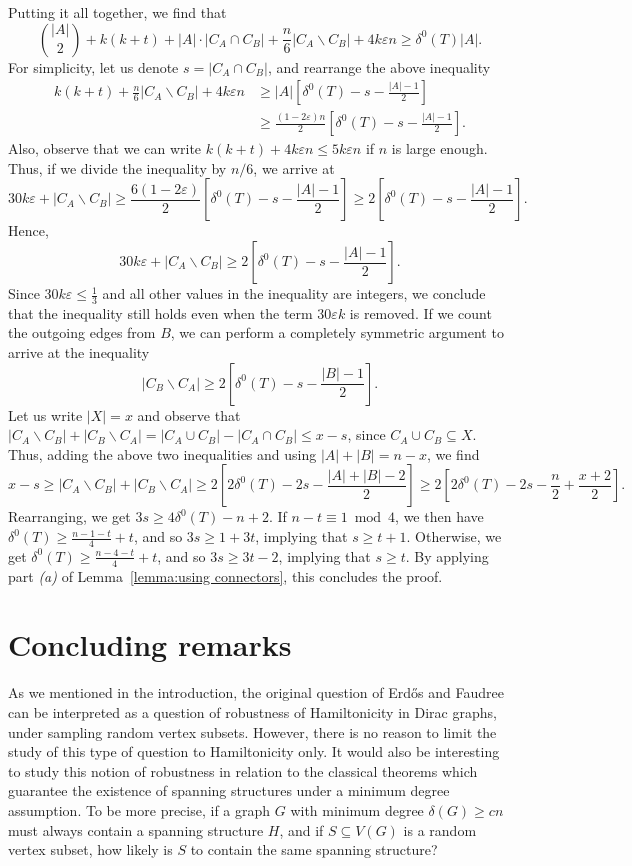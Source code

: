 \documentclass[a4paper,11pt]{article}
\makeatletter
\renewenvironment{proof}[1][\proofname] {\par\pushQED{\qed}\normalfont\topsep6\p@\@plus6\p@\relax\trivlist\item[\hskip\labelsep\textit{#1}\@addpunct{.}]\ignorespaces}{\popQED\endtrivlist\@endpefalse}
\theoremstyle{definition}
\def\eps{\varepsilon}
\makeatother
\begin{document}
\begin{proof}[Proof of Theorem~\ref{thm:main}.]
Putting it all together, we find that
\[\binom{|A|}{2}+k(k+t)+|A|\cdot |C_A\cap C_B|+\frac{n}{6}|C_A\backslash C_B|+4k\eps n\geq \delta^0(T) |A|.\]
For simplicity, let us denote $s=|C_A\cap C_B|$, and rearrange the above inequality
\begin{align*}
k(k+t)+\frac{n}{6}|C_A\backslash C_B|+4k\eps n&\geq |A|\left[\delta^0(T)-s-\frac{|A|-1}{2}\right]\\
&\geq \frac{(1-2\eps)n}{2}\left[\delta^0(T)-s-\frac{|A|-1}{2}\right].
\end{align*}
Also, observe that we can write $k(k+t)+4k\eps n\leq 5k\eps n$ if $n$ is large enough. Thus, if we divide the inequality by $n/6$, we arrive at 
\[30k\eps+|C_A\backslash C_B|\geq \frac{6(1-2\eps)}{2}\left[\delta^0(T)-s-\frac{|A|-1}{2}\right]\geq 2\left[\delta^0(T)-s-\frac{|A|-1}{2}\right].
\]
Hence,
\[30k\eps+|C_A\backslash C_B|\geq 2\left[\delta^0(T)-s-\frac{|A|-1}{2}\right].\]
Since $30k\eps\leq \frac{1}{3}$ and all other values in the inequality are integers, we conclude that the inequality still holds even when the term $30\eps k$ is removed. If we count the outgoing edges from $B$, we can perform a completely symmetric argument to arrive at the inequality
\[|C_B\backslash C_A|\geq 2\left[\delta^0(T)-s-\frac{|B|-1}{2}\right].\]
Let us write $|X|=x$ and observe that $|C_A\backslash C_B|+|C_B\backslash C_A|=|C_A\cup C_B|-|C_A\cap C_B|\leq x-s$, since $C_A\cup C_B\subseteq X$. Thus, adding the above two inequalities and using $|A|+|B|=n-x$, we find
\[x-s\geq |C_A\backslash C_B|+|C_B\backslash C_A|\geq 2\left[2\delta^0(T)-2s-\frac{|A|+|B|-2}{2}\right]\geq 2\left[2\delta^0(T)-2s-\frac{n}{2}+\frac{x+2}{2}\right].\]
Rearranging, we get $3s\geq 4\delta^0(T) - n+2$. If $n-t\equiv 1\bmod 4$, we then have $\delta^0(T)\geq \frac{n-1-t}{4}+t$, and so $3s\geq 1+3t$, implying that $s\geq t+1$. Otherwise, we get $\delta^0(T)\geq \frac{n-4-t}{4}+t$, and so $3s\geq 3t-2$, implying that $s\geq t$. By applying part \textit{(a)} of Lemma~\ref{lemma:using connectors}, this concludes the proof.
\end{proof}

\section{Concluding remarks}

As we mentioned in the introduction, the original question of Erd\H{o}s and Faudree can be interpreted as a question of robustness of Hamiltonicity in Dirac graphs, under sampling random vertex subsets. However, there is no reason to limit the study of this type of question to Hamiltonicity only. It would also be interesting to study this notion of robustness in relation to the classical theorems which guarantee the existence of spanning structures under a minimum degree assumption. To be more precise, if a graph $G$ with minimum degree $\delta(G)\geq c n$ must always contain a spanning structure $H$, and if $S\subseteq V(G)$ is a random vertex subset, how likely is $S$ to contain the same spanning structure? 
\end{document}
